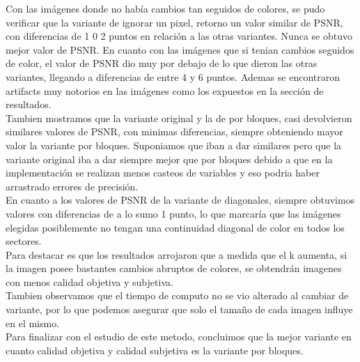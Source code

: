 \documentclass[a4paper]{article}
\newcounter{col}
\begin{document}
 Con las im\'agenes donde no hab\'ia cambios tan seguidos de colores, se pudo verificar que la variante de ignorar un pixel, retorno un valor similar de PSNR, con diferencias de 1 0 2 puntos en relaci\'on a las otras variantes. Nunca se obtuvo mejor valor de PSNR.
 En cuanto con las im\'agenes que si tenian cambios seguidos de color, el valor de PSNR dio muy por debajo de lo que dieron las otras variantes, llegando a diferencias de entre 4 y 6 puntos. Ademas se encontraron artifacts muy notorios en las im\'agenes como los expuestos en la secci\'on de resultados.\\
 Tambien mostramos que la variante original y la de por bloques, casi devolvieron similares valores de PSNR, con minimas diferencias, siempre obteniendo mayor valor la variante por bloques. Suponiamos que iban a dar similares pero que la variante original iba a dar siempre mejor que por bloques debido a que en la implementaci\'on se realizan menos casteos de variables y eso podria haber arrastrado errores de precisi\'on.\\
 En cuanto a los valores de PSNR de la variante de diagonales, siempre obtuvimos valores con diferencias de a lo sumo 1 punto, lo que marcar\'ia que las im\'agenes elegidas posiblemente no tengan una continuidad diagonal de color en todos los sectores.\\
 Para destacar es que los resultados arrojaron que a medida que el k aumenta, si la imagen posee bastantes cambios abruptos de colores, se obtendr\'an imagenes con menos calidad objetiva y subjetiva.\\
 Tambien observamos que el tiempo de computo no se vio alterado al cambiar de variante, por lo que podemos asegurar que solo el tamaño de cada imagen influye en el mismo.\\
 Para finalizar con el estudio de este metodo, concluimos que la mejor variante en cuanto calidad objetiva y calidad subjetiva es la variante por bloques.
\end{document}
